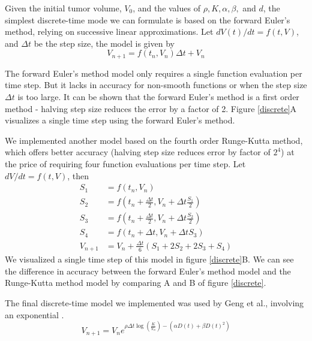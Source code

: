 \documentclass[letterpaper
, superscriptaddress
, twocolumn
, aps
]{revtex4}
\begin{document}
Given the initial tumor volume, $V_{0}$, and the values of $\rho, K, \alpha, \beta,$ and $d$, the simplest discrete-time mode we can formulate is based on the forward Euler's method, relying on successive linear approximations. Let $dV(t)/dt = f(t,V)$, and $\Delta t$ be the step size, the model is given by
\begin{equation}\label{5}
V_{n + 1} = f(t_{n}, V_{n}) \Delta t + V_{n}
\end{equation}

The forward Euler's method model only requires a single function evaluation per time step. But it lacks in accuracy for non-smooth functions or when the step size $\Delta t$ is too large. It can be shown that the forward Euler's method is a first order method - halving step size reduces the error by a factor of 2. Figure \ref{discrete}A visualizes a single time step using the forward Euler's method.

We implemented another model based on the fourth order Runge-Kutta method, which offers better accuracy (halving step size reduces error by factor of $2^{4}$) at the price of requiring four function evaluations per time step. Let $dV/dt = f(t, V)$, then
\begin{equation}\label{6}
\begin{aligned}
S_{1} &= f(t_{n}, V_{n})\\
S_{2} &= f(t_{n} + \frac{\Delta t}{2}, V_{n} + \Delta t\frac{S_{1}}{2})\\
S_{3} &= f(t_{n} + \frac{\Delta t}{2}, V_{n} + \Delta t\frac{S_{2}}{2})\\
S_{4} &= f(t_{n} + \Delta t, V_{n} + \Delta t S_{3})\\
V_{n + 1} &= V_{n} + \frac{\Delta t}{6} (S_{1} + 2S_{2} + 2S_{3} + S_{4})
\end{aligned}
\end{equation}
We visualized a single time step of this model in figure \ref{discrete}B. We can see the difference in accuracy between the forward Euler's method model and the Runge-Kutta method model by comparing A and B of figure \ref{discrete}. 

The final discrete-time model we implemented was used by Geng et al., involving an exponential \cite{Changran2018}.
\begin{equation}\label{7}
V_{n + 1} = V_{n} e^{\rho \Delta t \log \left( \frac{K}{V_{n}} \right) - (\alpha D(t) + \beta D(t)^{2})}
\end{equation}

\end{document}
